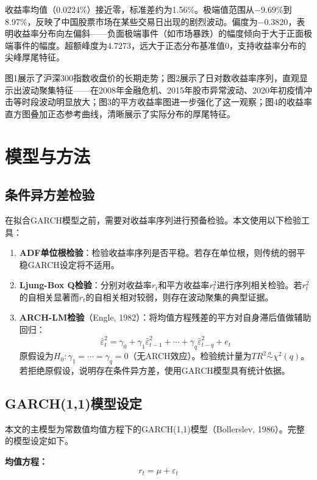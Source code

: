 \documentclass[11pt,a4paper]{article}
\begin{document}
收益率均值（0.0224\%）接近零，标准差约为1.56\%。极端值范围从$-9.69\%$到8.97\%，反映了中国股票市场在某些交易日出现的剧烈波动。偏度为$-0.3820$，表明收益率分布向左偏斜——负面极端事件（如市场暴跌）的幅度倾向于大于正面极端事件的幅度。超额峰度为4.7273，远大于正态分布基准值0，支持收益率分布的尖峰厚尾特征。

图1展示了沪深300指数收盘价的长期走势；图2展示了日对数收益率序列，直观显示出波动聚集特征——在2008年金融危机、2015年股市异常波动、2020年初疫情冲击等时段波动明显放大；图3的平方收益率图进一步强化了这一观察；图4的收益率直方图叠加正态参考曲线，清晰展示了实际分布的厚尾特征。

\section{模型与方法}

\subsection{条件异方差检验}

在拟合GARCH模型之前，需要对收益率序列进行预备检验。本文使用以下检验工具：

\begin{enumerate}[nosep]
\item \textbf{ADF单位根检验}：检验收益率序列是否平稳。若存在单位根，则传统的弱平稳GARCH设定将不适用。
\item \textbf{Ljung-Box Q检验}：分别对收益率\(r_t\)和平方收益率\(r_t^2\)进行序列相关检验。若\(r_t^2\)的自相关显著而\(r_t\)的自相关相对较弱，则存在波动聚集的典型证据。
\item \textbf{ARCH-LM检验}（Engle, 1982）：将均值方程残差的平方对自身滞后值做辅助回归：
\[
\hat{\varepsilon}_t^2 = \gamma_0 + \gamma_1 \hat{\varepsilon}_{t-1}^2 + \cdots + \gamma_q \hat{\varepsilon}_{t-q}^2 + e_t
\]
原假设为\(H_0: \gamma_1 = \cdots = \gamma_q = 0\)（无ARCH效应）。检验统计量为\(TR^2 \stackrel{a}{\sim} \chi^2(q)\)。若拒绝原假设，说明存在条件异方差，使用GARCH模型具有统计依据。
\end{enumerate}

\subsection{GARCH(1,1)模型设定}

本文的主模型为常数值均值方程下的GARCH(1,1)模型（Bollerslev, 1986）。完整的模型设定如下。

\textbf{均值方程：}
\[
r_t = \mu + \varepsilon_t
\]
\end{document}
